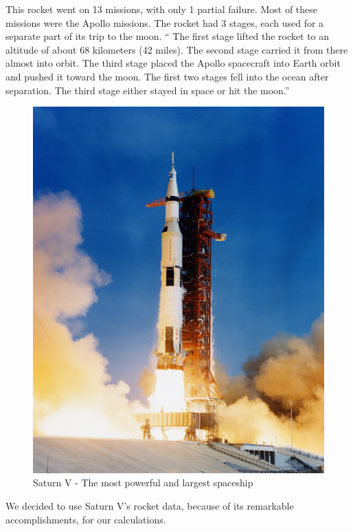 \documentclass[11pt]{article}
\begin{document}
\vspace{.25cm}
This rocket went on 13 missions, with only 1 partial failure. Most of these missions were the Apollo missions. The rocket had 3 stages, each used for a separate part of its trip to the moon. `` The first stage lifted the rocket to an altitude of about 68 kilometers (42 miles). The second stage carried it from there almost into orbit. The third stage placed the Apollo spacecraft into Earth orbit and pushed it toward the moon. The first two stages fell into the ocean after separation. The third stage either stayed in space or hit the moon.'' \cite{saturnv}

\begin{figure}[H]
\centering
\includegraphics[scale=0.35]{SaturnV.jpg}
\caption{Saturn V - The most powerful and largest spaceship}
\end{figure}

\vspace{.25cm}

We decided to use Saturn V's rocket data, because of its remarkable accomplishments, for our calculations.
\end{document}
